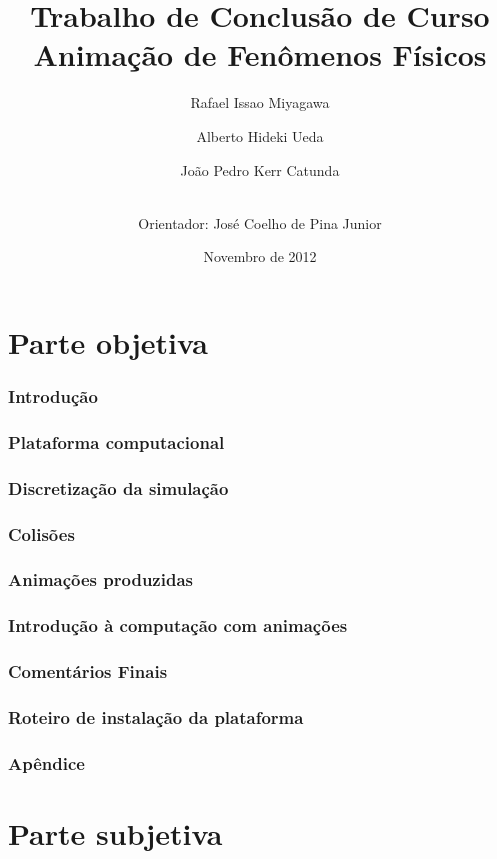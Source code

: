 \documentclass[a4paper,12pt,titlepage]{article}
\title{Trabalho de Conclusão de Curso \\
Animação de Fenômenos Físicos}
\author{Rafael Issao Miyagawa \and Alberto Hideki Ueda \and 
		João Pedro Kerr Catunda \\ \ \and
        Orientador: José Coelho de Pina Junior }
\date{Novembro de 2012}
\begin{document}
\maketitle
\tableofcontents
\pagebreak

\part{Parte objetiva}

\section{Introdução}

\newpage

\section{Plataforma computacional}

\newpage

\section{Discretização da simulação}

\newpage

\section{Colisões}

\newpage

\section{Animações produzidas}

\newpage

\section{Introdução à computação com animações}

\newpage

\section{Comentários Finais}

\newpage

%
%
\newpage

\section{Roteiro de instalação da plataforma}

\newpage

\section{Apêndice} \label{apendice}

\newpage

\part{Parte subjetiva}

\newpage 
\end{document}
